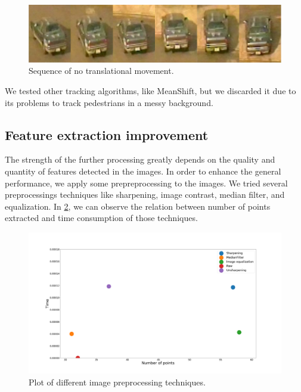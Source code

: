 \begin{figure}[H]
\centering         
\includegraphics[width=0.9\linewidth]{changeCamera/out2.png}
\caption{Sequence of no translational movement.} \label{experiTrack2}
\end{figure}

We tested other tracking algorithms, like MeanShift, but we discarded it due to its problems to track pedestrians in a messy background.






\subsection{Feature extraction improvement}\label{exper:validation}

The strength of the further processing greatly depends on the quality and quantity of features detected in the images. In order to enhance the general performance, we apply some prepreprocessing to the images. We tried several preprocessings techniques like sharpening, image contrast, median filter, and equalization. In \ref{experiTrack3}, we can observe the relation between number of points extracted and time consumption of those techniques.




\begin{figure}[H]
\centering         
\includegraphics[width=0.9\linewidth]{tracker/preprocesing.png}
\caption{Plot of different image preprocessing techniques.} \label{experiTrack3}
\end{figure}

